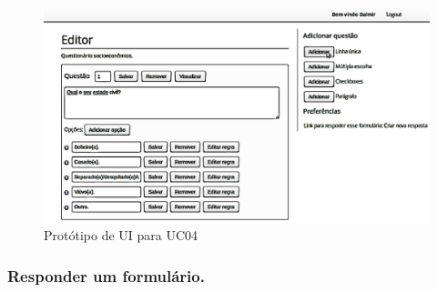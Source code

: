 \documentclass[11pt]{article}
\begin{document}
        \begin{figure}[h!]
          \centering
          \includegraphics[width=.9\textwidth]{editor.png}
          \caption{Protótipo de UI para UC04}
        \end{figure}

    \clearpage
      
      \subsubsection{Responder um formulário.}
\end{document}
